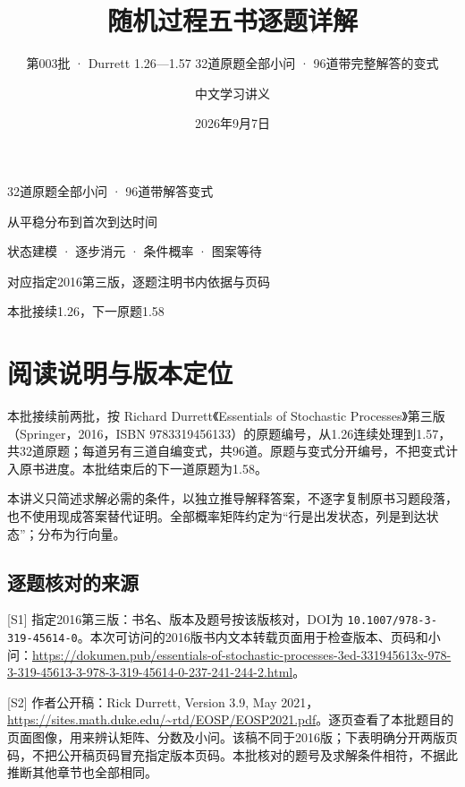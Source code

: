 \documentclass[
  11pt,
  a4paper,
  UTF8,
  fontset=fandol]{ctexart}
\title{随机过程五书逐题详解}
\subtitle{第003批 · Durrett 1.26---1.57 32道原题全部小问 ·
96道带完整解答的变式}
\author{中文学习讲义}
\date{2026年9月7日}
\begin{document}
\maketitle
\thispagestyle{empty}
\vspace{1cm}
\begin{center}
{\large 32道原题全部小问 · 96道带解答变式}\par\vspace{1cm}
从平稳分布到首次到达时间\par
状态建模 · 逐步消元 · 条件概率 · 图案等待\par\vspace{1cm}
对应指定2016第三版，逐题注明书内依据与页码\par
本批接续1.26，下一原题1.58
\end{center}
\clearpage

{
\hypersetup{linkcolor=}
\setcounter{tocdepth}{1}
\tableofcontents
}
\clearpage
{}
\section{阅读说明与版本定位}\label{ux9605ux8bfbux8bf4ux660eux4e0eux7248ux672cux5b9aux4f4d}

本批接续前两批，按 Richard Durrett《Essentials of Stochastic
Processes》第三版（Springer，2016，ISBN
9783319456133）的原题编号，从1.26连续处理到1.57，共32道原题；每道另有三道自编变式，共96道。原题与变式分开编号，不把变式计入原书进度。本批结束后的下一道原题为1.58。

本讲义只简述求解必需的条件，以独立推导解释答案，不逐字复制原书习题段落，也不使用现成答案替代证明。全部概率矩阵约定为``行是出发状态，列是到达状态''；分布为行向量。

\subsection{逐题核对的来源}\label{ux9010ux9898ux6838ux5bf9ux7684ux6765ux6e90}

{[}S1{]} 指定2016第三版：书名、版本及题号按该版核对，DOI为
\texttt{10.1007/978-3-319-45614-0}。本次可访问的2016版书内文本转载页面用于检查版本、页码和小问：\url{https://dokumen.pub/essentials-of-stochastic-processes-3ed-331945613x-978-3-319-45613-3-978-3-319-45614-0-237-241-244-2.html}。

{[}S2{]} 作者公开稿：Rick Durrett, Version 3.9, May
2021，\url{https://sites.math.duke.edu/~rtd/EOSP/EOSP2021.pdf}。逐页查看了本批题目的页面图像，用来辨认矩阵、分数及小问。该稿不同于2016版；下表明确分开两版页码，不把公开稿页码冒充指定版本页码。本批核对的题号及求解条件相符，不据此推断其他章节也全部相同。
\end{document}
